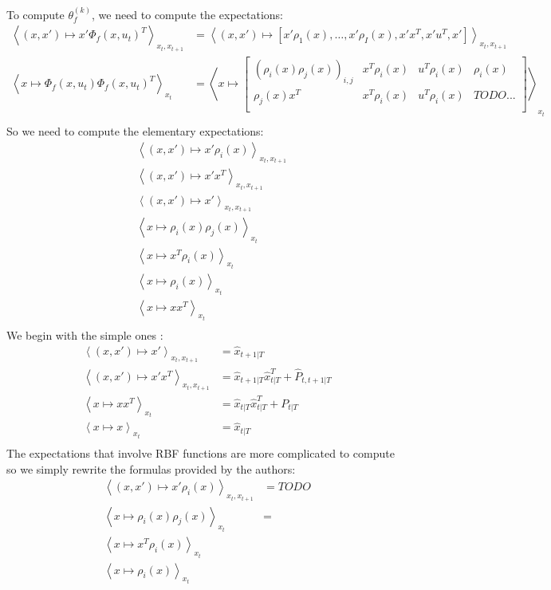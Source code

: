 To compute $\theta_f^{(k)}$, we need to compute the expectations:
\begin{align*}
  \left< (x,x') \mapsto x' \Phi_f(x,u_t)^T \right>_{x_t,x_{t+1}} &=
    \left< (x,x') \mapsto [x'\rho_1(x), \ldots , x'\rho_I(x), x'x^T, x'u^T, x']\right>_{x_t,x_{t+1}}
  \\
  \left< x \mapsto \Phi_f(x, u_t)\Phi_f(x,u_t)^T \right>_{x_t} &=
    \left< x \mapsto \left[
      \begin{array}{cccc}
        (\rho_i(x)\rho_j(x))_{i,j} & x^T \rho_i(x) & u^T \rho_i(x) & \rho_i(x) \\
        \rho_j(x)x^T & x^T \rho_i(x) & u^T \rho_i(x) & TODO... \\
      \end{array}
    \right] \right>_{x_t}
  \\
\end{align*}
So we need to compute the elementary expectations:
\begin{align*}
  &\left< (x,x') \mapsto x'\rho_i(x) \right>_{x_t,x_{t+1}}\\
  &\left< (x,x') \mapsto x'x^T \right>_{x_t,x_{t+1}}\\
  &\left< (x,x') \mapsto x' \right>_{x_t,x_{t+1}}\\
  &\left< x \mapsto \rho_i(x)\rho_j(x) \right>_{x_t}\\
  &\left< x \mapsto x^T \rho_i(x) \right>_{x_t}\\
  &\left< x \mapsto \rho_i(x) \right>_{x_t}\\
  &\left< x \mapsto xx^T \right>_{x_t}\\
\end{align*}
We begin with the simple ones :
\begin{align*}
  \left< (x,x') \mapsto x'\right>_{x_t,x_{t+1}} &= \hat{x}_{t+1|T}\\
  \left< (x,x') \mapsto x'x^T\right>_{x_t,x_{t+1}} &= \hat{x}_{t+1|T}\hat{x}_{t|T}^T + \hat{P}_{t,t+1|T}\\
  \left< x \mapsto xx^T\right>_{x_t} &= \hat{x}_{t|T}\hat{x}_{t|T}^T + P_{t|T}\\
  \left< x \mapsto x\right>_{x_t} &= \hat{x}_{t|T}\\
\end{align*}
The expectations that involve RBF functions are more complicated to compute so we simply rewrite the formulas provided by the authors:
\begin{align*}
  \left<(x,x') \mapsto x'\rho_i(x)\right>_{x_t,x_{t+1}} &= TODO\\
  \left<x \mapsto \rho_i(x)\rho_j(x)\right>_{x_t} &= \\
  \left<x \mapsto x^T \rho_i(x)\right>_{x_t}\\
  \left<x \mapsto \rho_i(x)\right>_{x_t}\\
\end{align*}
